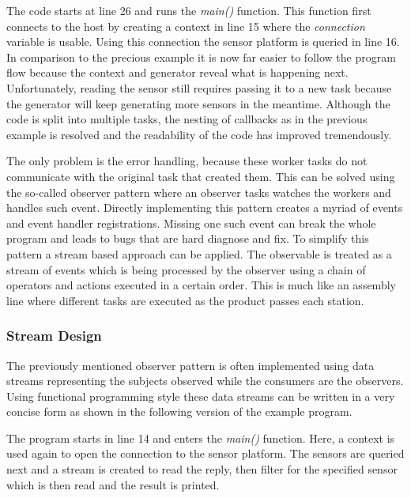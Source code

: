 The code starts at line \num{26} and runs the \textit{main()} function. This function first connects to the host by creating a context in line \num{15} where the \textit{connection} variable is usable. Using this connection the sensor platform is queried in line \num{16}. In comparison to the precious example it is now far easier to follow the program flow because the context and generator reveal what is happening next. Unfortunately, reading the sensor still requires passing it to a new task because the generator will keep generating more sensors in the meantime. Although the code is split into multiple tasks, the nesting of callbacks as in the previous example is resolved and the readability of the code has improved tremendously.

The only problem is the error handling, because these worker tasks do not communicate with the original task that created them. This can be solved using the so-called observer pattern where an observer tasks watches the workers and handles such event. Directly implementing this pattern creates a myriad of events and event handler registrations. Missing one such event can break the whole program and leads to bugs that are hard diagnose and fix. To simplify this pattern a stream based approach can be applied. The observable is treated as a stream of events which is being processed by the observer using a chain of operators and actions executed in a certain order. This is much like an assembly line where different tasks are executed as the product passes each station.

\subsubsection{Stream Design}
The previously mentioned observer pattern is often implemented using data streams representing the subjects observed while the consumers are the observers. Using functional programming style these data streams can be written in a very concise form as shown in the following version of the example program.


The program starts in line \num{14} and enters the \textit{main()} function. Here, a context is used again to open the connection to the sensor platform. The sensors are queried next and a stream is created to read the reply, then filter for the specified sensor which is then read and the result is printed.

